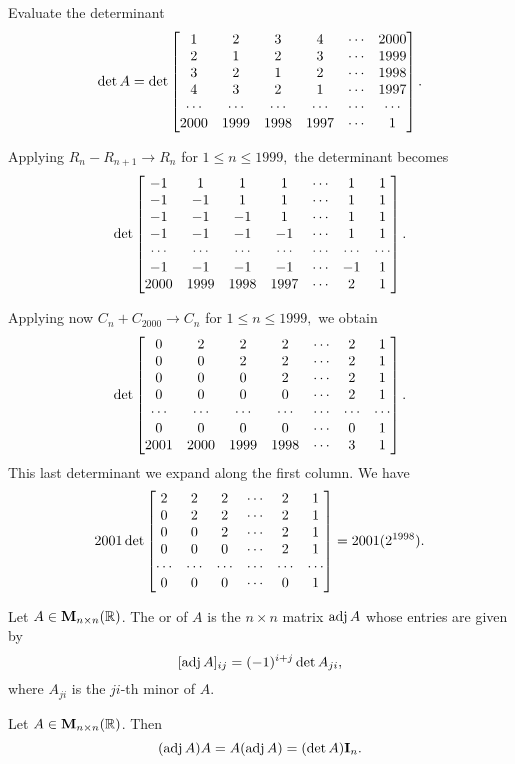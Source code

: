  \begin{exa}
Evaluate the determinant
 $$\det A = \det\begin{bmatrix}1 & 2 & 3 & 4 & \cdots & 2000 \cr
 2 & 1 & 2 & 3 & \cdots & 1999 \cr 3 & 2 & 1 & 2 & \cdots & 1998
 \cr 4 & 3 & 2 & 1 & \cdots & 1997 \cr \cdots & \cdots & \cdots &
 \cdots & \cdots & \cdots \cr  2000 & 1999 & 1998 & 1997 & \cdots &
 1 \cr \end{bmatrix}.$$
 \end{exa}\begin{solu}Applying $R_n - R_{n + 1}\rightarrow R_n$ for $1
 \leq n \leq 1999,$ the determinant becomes
 $$\det\begin{bmatrix}-1 & 1 & 1 & 1 & \cdots  & 1 & 1 \cr
 -1 & -1 & 1 & 1 & \cdots & 1 & 1 \cr -1 & -1 & -1 & 1 & \cdots & 1
 & 1 \cr -1 & -1 & -1 & -1 & \cdots & 1 & 1 \cr \cdots & \cdots &
 \cdots & \cdots & \cdots & \cdots & \cdots \cr -1 & -1 & -1 & -1 &
 \cdots & -1 & 1 \cr 2000 & 1999 & 1998 & 1997 & \cdots  & 2 & 1
 \cr \end{bmatrix}.$$

 Applying now $C_n + C_{2000}\rightarrow C_n$ for $1 \leq n \leq
 1999,$ we obtain
 $$\det\begin{bmatrix}0 & 2 & 2 & 2 & \cdots  & 2 & 1 \cr
 0 & 0 & 2 & 2 & \cdots & 2 & 1 \cr 0 & 0 & 0 & 2 & \cdots  & 2 & 1
 \cr 0 & 0 & 0 & 0 & \cdots & 2 & 1 \cr \cdots & \cdots & \cdots &
 \cdots & \cdots & \cdots & \cdots \cr 0 & 0 & 0 & 0 & \cdots & 0 &
 1 \cr 2001 & 2000 & 1999 & 1998 & \cdots  & 3 & 1 \cr \end{bmatrix}.$$ This
 last determinant we expand along the first column. We have
 $$2001\det\begin{bmatrix}2 & 2 & 2 & \cdots  & 2 & 1 \cr
 0 & 2 & 2 & \cdots & 2 & 1 \cr 0 & 0 & 2 & \cdots  & 2 & 1 \cr  0
 & 0 & 0 & \cdots & 2 & 1 \cr  \cdots & \cdots & \cdots & \cdots &
 \cdots & \cdots \cr  0 & 0 & 0 & \cdots & 0 & 1 \cr \end{bmatrix} =
 2001(2^{1998}).$$
\end{solu}
\begin{df}Let $A\in{\mathbf M}_{n\times n}( \mathbb{R})$. The  or
 of $A$ is the $n\times n$ matrix $\operatorname{adj}{A}$ whose
entries are given by 
$$[\operatorname{adj}{A}]_{ij} = (-1)^{i + j} \det A_{ji},
$$where $A_{ji}$ is the $ji$-th minor of $A$.
\end{df}
\begin{thm}Let $A\in{\mathbf M}_{n\times n}( \mathbb{R})$.
Then $$(\operatorname{adj}{A})A = A(\operatorname{adj}{A}) = (\det A){\textbf  I}_n.    $$
\end{thm}
